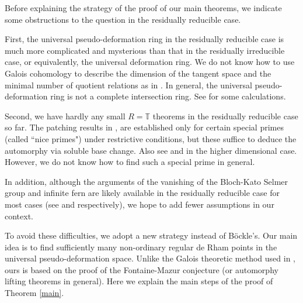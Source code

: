\documentclass[a4paper, 12pt]{amsart}
\DeclareMathOperator{\Spec}{Spec}
\def\ps{\mathrm{ps}}
\newcommand{\Q}{\mathbb{Q}}
\newcommand{\T}{\mathbb{T}}
\begin{document}

     Before explaining the strategy of the proof of our main theorems, we indicate some obstructions to the question in the residually reducible case. 
     
     First, the universal pseudo-deformation ring in the residually reducible case is much more complicated and mysterious than that in the residually irreducible case, or equivalently, the universal deformation ring. We do not know how to use Galois cohomology to describe the dimension of the tangent space and the minimal number of quotient relations as in \cite[Proposition 1.5.1, page 30]{Berger_2013}. In general, the universal pseudo-deformation ring is not a complete intersection ring. See \cite{Deo2022} for some calculations.
	
	Second, we have hardly any small $R=\T$ theorems in the residually reducible case so far. The patching results in \cite{Skinner_1999}, \cite{pan2022fontaine} are established only for certain special primes (called ``nice primes") under restrictive conditions, but these suffice to deduce the automorphy via soluble base change. Also see \cite{Thorne_2014} and \cite{Allen_2020} in the higher dimensional case. However, we do not know how to find such a special prime in general.
	
	In addition, although the arguments of the vanishing of the Bloch-Kato Selmer group and infinite fern are likely available in the residually reducible case for most cases (see \cite{NewtonThorne} and \cite{Hernandez:2022aa} respectively), we hope to add fewer assumptions in our context.
	
	To avoid these difficulties, we adopt a new strategy instead of B\"ockle's. Our main idea is to find sufficiently many non-ordinary regular de Rham points in the universal pseudo-deformation space. Unlike the Galois theoretic method used in \cite{Fakhruddin2022}, ours is based on the proof of the Fontaine-Mazur conjecture (or automorphy lifting theorems in general). Here we explain the main steps of the proof of Theorem \ref{main}.
	
\end{document}
